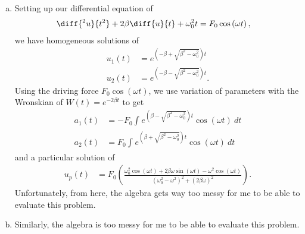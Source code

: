 \documentclass[10pt]{mypackage}
\begin{document}
\begin{solution}[39.13]\hfill
  \begin{enumerate}[(a)]
    \item Setting up our differential equation of
      \begin{align*}
        \diff{^2u}{t^2} + 2\beta \diff{u}{t} + \omega_0^2 t &= F_0\cos\left( \omega t \right),
      \end{align*}
      we have homogeneous solutions of
      \begin{align*}
        u_{1}(t) &= e^{\left( -\beta + \sqrt{\beta^2 - \omega_0^2} \right)t}\\
        u_{2}(t) &= e^{\left( -\beta - \sqrt{\beta^2 - \omega_0^2} \right)t}.
      \end{align*}
      Using the driving force $F_0\cos\left( \omega t \right)$, we use variation of parameters with the Wronskian of $W(t) = e^{-2\beta t}$ to get
      \begin{align*}
        a_1(t) &= -F_0\int_{}^{} e^{\left( \beta - \sqrt{\beta^2 - \omega_0^2} \right)t} \cos\left( \omega t \right)\:dt\\
        a_2(t) &= F_0\int_{}^{} e^{\left( \beta + \sqrt{\beta^2 - \omega_0^2} \right)t}\cos\left( \omega t \right)\:dt
      \end{align*}
      and a particular solution of
      \begin{align*}
        u_p(t) &= F_0\left( \frac{\omega_0^2\cos\left( \omega t \right) + 2\beta\omega\sin\left( \omega t \right) - \omega^2\cos\left( \omega t \right)}{\left( \omega_0^2 - \omega^2 \right)^2 + \left( 2\beta\omega \right)^2} \right).
      \end{align*}
      Unfortunately, from here, the algebra gets way too messy for me to be able to evaluate this problem.
    \item Similarly, the algebra is too messy for me to be able to evaluate this problem.
  \end{enumerate}
\end{solution}
\end{document}
